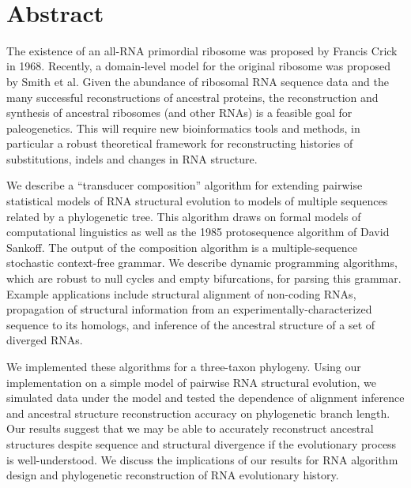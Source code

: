 \documentclass[10pt]{article}
\date{}
\begin{document}
\begin{flushleft}
  {\Large
    \textbf{\titlestring}
  }
\\
\authorstring
\end{flushleft}


\newpage
\section*{Abstract}
The existence of an all-RNA primordial ribosome was proposed by
Francis Crick in 1968.  Recently, a domain-level model for the
original ribosome was proposed by Smith et al.  Given the abundance of
ribosomal RNA sequence data and the many successful reconstructions of
ancestral proteins, the reconstruction and synthesis of ancestral
ribosomes (and other RNAs) is a feasible goal for paleogenetics.  This
will require new bioinformatics tools and methods, in particular a
robust theoretical framework for reconstructing histories of
substitutions, indels and changes in RNA structure.

We describe a ``transducer composition'' algorithm for extending
pairwise statistical models of RNA structural evolution to models of
multiple sequences related by a phylogenetic tree.  This algorithm
draws on formal models of computational linguistics as well as the
1985 protosequence algorithm of David Sankoff.  The output of the
composition algorithm is a multiple-sequence stochastic context-free
grammar.  We describe dynamic programming algorithms, which are robust
to null cycles and empty bifurcations, for parsing this grammar.
Example applications include structural alignment of non-coding RNAs,
propagation of structural information from an
experimentally-characterized sequence to its homologs, and inference
of the ancestral structure of a set of diverged RNAs.

We implemented these algorithms for a three-taxon phylogeny.  Using
our implementation on a simple model of pairwise RNA structural
evolution, we simulated data under the model and tested the dependence
of alignment inference and ancestral structure reconstruction accuracy on phylogenetic branch length.
Our results suggest that
we may be able to accurately reconstruct ancestral structures despite
sequence and structural divergence if the evolutionary process is
well-understood.
We discuss the implications of our results for RNA algorithm design
and phylogenetic reconstruction of RNA evolutionary history.
\end{document}

